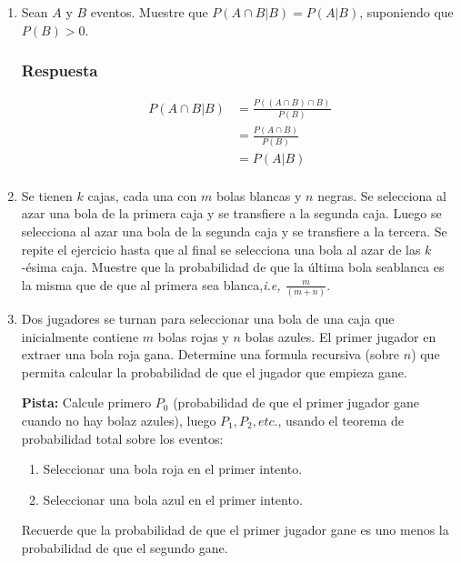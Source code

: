 \documentclass[dvipsnames,a4paper]{book}
\begin{document}
\begin{enumerate}[{Ej1. }]
\item Sean \(A\) y \(B\) eventos. Muestre que \(P\left(A\cap
    B|B\right)=P\left(A|B\right)\), suponiendo que \(P\left(B\right)>0\).

    \subsubsection{Respuesta}

    \begin{align*}
        P\left(A\cap B|B\right)&=\frac{P\left(\left(A\cap B\right) \cap B\right)}{P\left(B\right)}  \\
        &= \frac{P\left(A\cap B\right)}{P\left(B\right)} \\
        &= P\left(A|B\right) \\
    \end{align*}


\item Se tienen \(k\) cajas, cada una con \(m\) bolas blancas y \(n\) negras.
    Se selecciona al azar una bola de la primera caja y se transfiere a la
    segunda caja. Luego se selecciona al azar una bola de la segunda caja y se
    transfiere a la tercera. Se repite el ejercicio hasta que al final se
    selecciona una bola al azar de las \(k\)-ésima caja. Muestre que la
    probabilidad de que la última bola seablanca es la misma que de que al
    primera sea blanca,\textit{i.e, \(\frac{m}{\left(m+n\right) }\)}.









\item Dos jugadores se turnan para seleccionar una bola de una caja que
    inicialmente contiene {\color{red} \(m\) bolas rojas} y
    {\color{MidnightBlue} \(n\) bolas azules}. El primer jugador en extraer una
    {\color{red} bola roja gana}. Determine una formula recursiva (sobre
    {\color{MidnightBlue} \(n\)}) que permita calcular la probabilidad de que
    el jugador que empieza gane.

    \textbf{Pista:} Calcule primero \(P_0\) (probabilidad de que el primer jugador gane cuando no hay {\color{MidnightBlue} bolaz azules}), luego \(P_1,P_2,etc.\), usando el teorema de probabilidad total sobre los eventos:
    \begin{enumerate}[{(1) }]
        \item Seleccionar una bola roja en el primer intento.
        \item Seleccionar una {\color{MidnightBlue} bola azul} en el primer
            intento.
    \end{enumerate}
Recuerde que la probabilidad de que el primer jugador gane es uno menos la
probabilidad de que el segundo gane.


\end{enumerate}
\end{document}
